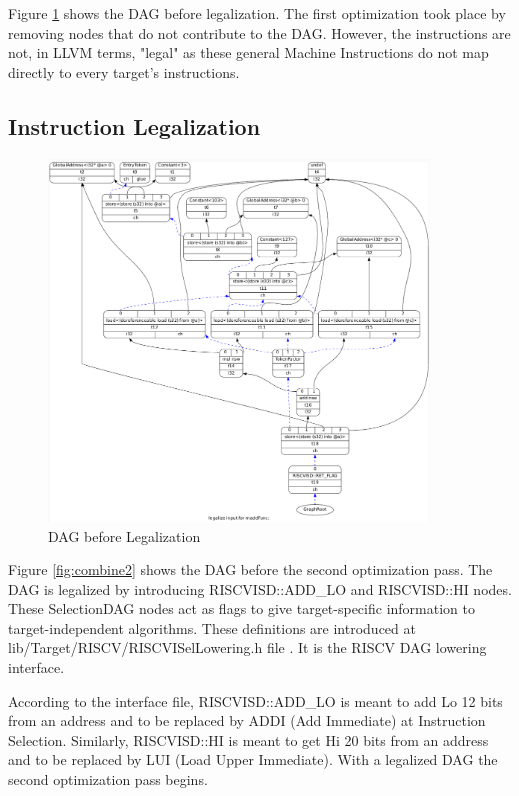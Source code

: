 Figure \ref{fig:legalize} shows the DAG before legalization. The first optimization took place by removing nodes that do not contribute to the DAG. However, the instructions are not, in LLVM terms, "legal" as these general Machine Instructions do not map directly to every target's instructions.  

\subsection{Instruction Legalization}

\begin{figure}
    \centering
    \includegraphics[width=0.9\textwidth]{path_instruction/madd_dag_legalize.png}
    \caption{DAG before Legalization}
    \label{fig:legalize}
\end{figure}

Figure \ref{fig:combine2} shows the DAG before the second optimization pass. The DAG is legalized by introducing RISCVISD::ADD\_LO and RISCVISD::HI nodes. These SelectionDAG nodes act as flags to give target-specific information to target-independent algorithms. These definitions are introduced at lib/Target/RISCV/RISCVISelLowering.h file \cite{riscvIselh}. It is the RISCV DAG lowering interface. 
\par
According to the interface file, RISCVISD::ADD\_LO is meant to add Lo 12 bits from an address and to be replaced by ADDI (Add Immediate) at Instruction Selection. Similarly, RISCVISD::HI is meant to get Hi 20 bits from an address and to be replaced by LUI (Load Upper Immediate). With a legalized DAG the second optimization pass begins.
